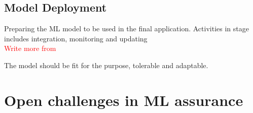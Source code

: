 \subsection{Model Deployment} 
Preparing the ML model to be used in the final application. Activities in stage includes integration, monitoring and updating \\\textcolor{red}{Write more from \cite{Ashmore2021}}

The model should be fit for the purpose, tolerable and adaptable.
\section{Open challenges in ML assurance}
